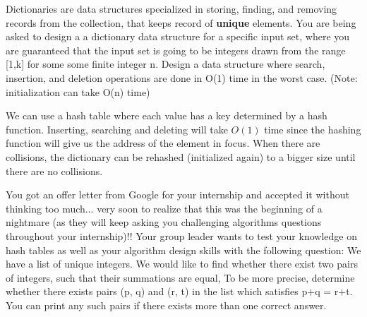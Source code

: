\documentclass[answers,addpoints,11pt]{exam}
\begin{document}
\begin{questions}
\question[5]
Dictionaries are data structures specialized in storing, finding, and removing records from the collection, that keeps record of {\bf unique} elements. You are being asked to design a a dictionary data structure for a specific input set, where you are guaranteed that the input set is going to be integers drawn from the range [1,k] for some some finite integer n. Design a data structure where search, insertion, and deletion operations are done in O(1) time in the worst case.  (Note: initialization can take O(n) time)

\begin{solution}
We can use a hash table where each value has a key determined by a hash function. Inserting, searching and deleting will take $O(1)$ time since the hashing function will give us the address of the element in focus. When there are collisions, the dictionary can be rehashed (initialized again) to a bigger size until there are no collisions.
\end{solution}

\question
You got an offer letter from Google for your internship and accepted it without thinking too much... very soon to realize that this was the beginning of a nightmare (as they will keep asking you challenging algorithms questions throughout your internship)!! Your group leader wants to test your knowledge on hash tables as well as your algorithm design skills with the following question: We have a list of unique integers. We would like to find whether there exist two pairs of integers, such that their summations are equal, To be more precise, determine whether there exists pairs (p, q) and (r, t) in the list which satisfies p+q = r+t. You can print any such pairs if there exists more than one correct answer.  
\begin{parts}

\end{parts}
\end{questions}
\end{document}

